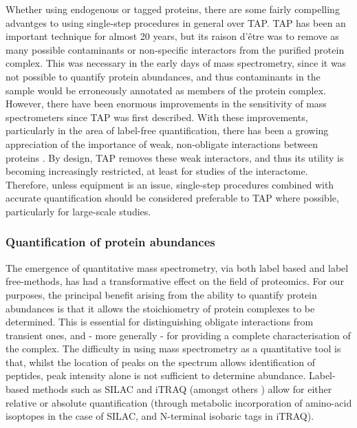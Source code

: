 \documentclass[a4paper,11pt,twoside,openright]{scrbook}
\begin{document}
Whether using endogenous or tagged proteins, there are some fairly compelling advantges to using single-step procedures in general over TAP. TAP has been an important technique for almost 20 years, but its raison d'être was to remove as many possible contaminants or non-specific interactors from the purified protein complex. This was necessary in the early days of mass spectrometry, since it was not possible to quantify protein abundances, and thus contaminants in the sample would be erroneously annotated as members of the protein complex. However, there have been enormous improvements in the sensitivity of mass spectrometers since TAP was first described. With these improvements, particularly in the area of label-free quantification, there has been a growing appreciation of the importance of weak, non-obligate interactions between proteins \cite{Perkins2010a,Hein2015}. By design, TAP removes these weak interactors, and thus its utility is becoming increasingly restricted, at least for studies of the interactome. Therefore, unless equipment is an issue, single-step procedures combined with accurate quantification should be considered preferable to TAP where possible, particularly for large-scale studies.

\subsubsection{Quantification of protein abundances}
The emergence of quantitative mass spectrometry, via both label based and label free-methods, has had a transformative effect on the field of proteomics. For our purposes, the principal benefit arising from the ability to quantify protein abundances is that it allows the stoichiometry of protein complexes to be determined. This is essential for distinguishing obligate interactions from transient ones, and - more generally - for providing a complete characterisation of the complex. The difficulty in using mass spectrometry as a quantitative tool is that, whilst the location of peaks on the spectrum allows identification of peptides, peak intensity alone is not sufficient to determine abundance. Label-based methods such as SILAC \cite{Ong2002a} and iTRAQ \cite{Ross2004} (amongst others \cite{Gygi1999,Thompson2003}) allow for either relative or absolute quantification (through metabolic incorporation of amino-acid isoptopes in the case of SILAC, and N-terminal isobaric tags in iTRAQ).
\end{document}
